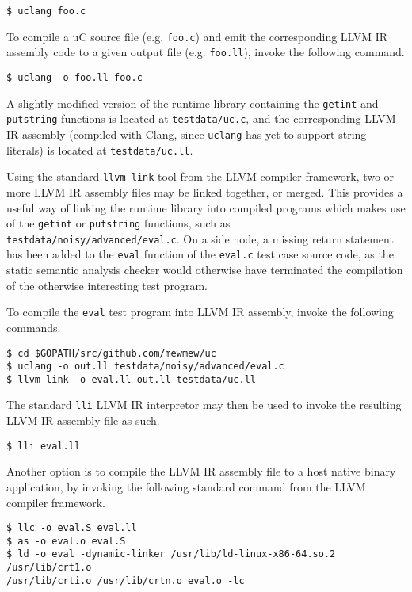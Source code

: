 \begin{verbatim}
$ uclang foo.c
\end{verbatim}

To compile a uC source file (e.g. \texttt{foo.c}) and emit the corresponding LLVM IR assembly code to a given output file (e.g. \texttt{foo.ll}), invoke the following command.

\begin{verbatim}
$ uclang -o foo.ll foo.c
\end{verbatim}

A slightly modified version of the runtime library containing the \texttt{getint} and \texttt{putstring} functions is located at \texttt{testdata/uc.c}, and the corresponding LLVM IR assembly (compiled with Clang, since \texttt{uclang} has yet to support string literals) is located at \texttt{testdata/uc.ll}.

Using the standard \texttt{llvm-link} tool from the LLVM compiler framework, two or more LLVM IR assembly files may be linked together, or merged. This provides a useful way of linking the runtime library into compiled programs which makes use of the \texttt{getint} or \texttt{putstring} functions, such as \texttt{testdata/noisy/advanced/eval.c}. On a side node, a missing return statement has been added to the \texttt{eval} function of the \texttt{eval.c} test case source code, as the static semantic analysis checker would otherwise have terminated the compilation of the otherwise interesting test program.

To compile the \texttt{eval} test program into LLVM IR assembly, invoke the following commands.

\begin{verbatim}
$ cd $GOPATH/src/github.com/mewmew/uc
$ uclang -o out.ll testdata/noisy/advanced/eval.c
$ llvm-link -o eval.ll out.ll testdata/uc.ll
\end{verbatim}

The standard \texttt{lli} LLVM IR interpretor may then be used to invoke the resulting LLVM IR assembly file as such.

\begin{verbatim}
$ lli eval.ll
\end{verbatim}

Another option is to compile the LLVM IR assembly file to a host native binary application, by invoking the following standard command from the LLVM compiler framework.

\begin{verbatim}
$ llc -o eval.S eval.ll
$ as -o eval.o eval.S
$ ld -o eval -dynamic-linker /usr/lib/ld-linux-x86-64.so.2 /usr/lib/crt1.o
/usr/lib/crti.o /usr/lib/crtn.o eval.o -lc
\end{verbatim}

